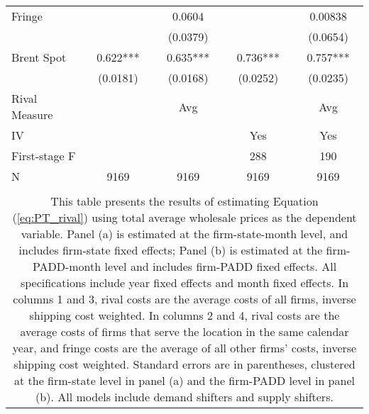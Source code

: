 \documentclass[12pt]{article}
\begin{document}
\begin{longtable}{l*{4}{c}}
\addlinespace
Fringe          &            &   0.0604   &            &  0.00838   \\
                &            & (0.0379)   &            & (0.0654)   \\
\addlinespace
Brent Spot      &    0.622***&    0.635***&    0.736***&    0.757***\\
                & (0.0181)   & (0.0168)   & (0.0252)   & (0.0235)   \\
\hline
Rival Measure   &            &      Avg   &            &      Avg   \\
IV              &            &            &      Yes   &      Yes   \\
First-stage F   &            &            &      288   &      190   \\
N               &     9169   &     9169   &     9169   &     9169   \\
\hline \\
\multicolumn{5}{c}{
  \begin{minipage}{.7\linewidth}
    This table presents the results of estimating Equation (\ref{eq:PT_rival}) using total average wholesale prices as the dependent variable. Panel (a) is estimated at the firm-state-month level, and includes firm-state fixed effects; Panel (b) is estimated at the firm-PADD-month level and includes firm-PADD fixed effects. All specifications include year fixed effects and month fixed effects. In columns 1 and 3, rival costs are the average costs of all firms, inverse shipping cost weighted. In columns 2 and 4, rival costs are the average costs of firms that serve the location in the same calendar year, and fringe costs are the average of all other firms' costs, inverse shipping cost weighted. Standard errors are in parentheses, clustered at the firm-state level in panel (a) and the firm-PADD level in panel (b). All models include demand shifters and supply shifters.
  \end{minipage}
  } \\
\end{longtable}
\end{document}
